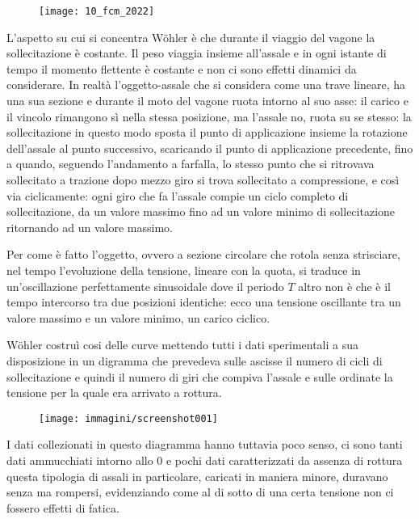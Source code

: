 \documentclass{article}
\begin{document}
		\begin{figure}[H]
		\texttt{[image: 10\_fcm\_2022]}
		\end{figure}
		\begin{adjustwidth}{2in}{}
		
		L'aspetto su cui si concentra Wöhler è che durante il viaggio del vagone la sollecitazione è costante. Il peso viaggia insieme all'assale e in ogni istante di tempo il momento flettente è costante e non ci sono effetti dinamici da considerare. In realtà l'oggetto-assale che si considera come una trave lineare, ha una sua sezione e durante il moto del vagone ruota intorno al suo asse: il carico e il vincolo rimangono sì nella stessa posizione, ma l'assale no, ruota su se stesso: la sollecitazione in questo modo sposta il punto di applicazione insieme la rotazione dell'assale al punto successivo, scaricando il punto di applicazione precedente, fino a quando, seguendo l'andamento a farfalla, lo stesso punto che si ritrovava sollecitato a trazione dopo mezzo giro si trova sollecitato a compressione, e così via ciclicamente: ogni giro che fa l'assale compie un ciclo completo di sollecitazione, da un valore massimo fino ad un valore minimo di sollecitazione ritornando ad un valore massimo.
		
		Per come è fatto l'oggetto, ovvero a sezione circolare che rotola senza strisciare, nel tempo l'evoluzione della tensione, lineare con la quota, si traduce in un'oscillazione perfettamente sinusoidale dove il periodo $ T $ altro non è che è il tempo intercorso tra due posizioni identiche: ecco una tensione oscillante tra un valore massimo  e un valore minimo, un carico ciclico. \newline
		
		Wöhler costruì cosi delle curve mettendo tutti i dati sperimentali a sua disposizione in un digramma che prevedeva sulle ascisse il numero di cicli di sollecitazione e quindi il numero di giri che compiva l'assale e sulle ordinate la tensione per la quale era arrivato a rottura. 
		
		\begin{figure}[H]
			\centering
			\texttt{[image: immagini/screenshot001]}
			\label{fig:screenshot001}
		\end{figure}
		
		
		I dati collezionati in questo diagramma hanno tuttavia poco senso, ci sono tanti dati ammucchiati intorno allo $ 0 $ e pochi dati caratterizzati da assenza di rottura questa tipologia di assali in particolare, caricati in maniera minore, duravano senza ma rompersi, evidenziando come al di sotto di una certa tensione non ci fossero effetti di fatica. \newline
		

\end{adjustwidth}
\end{document}
